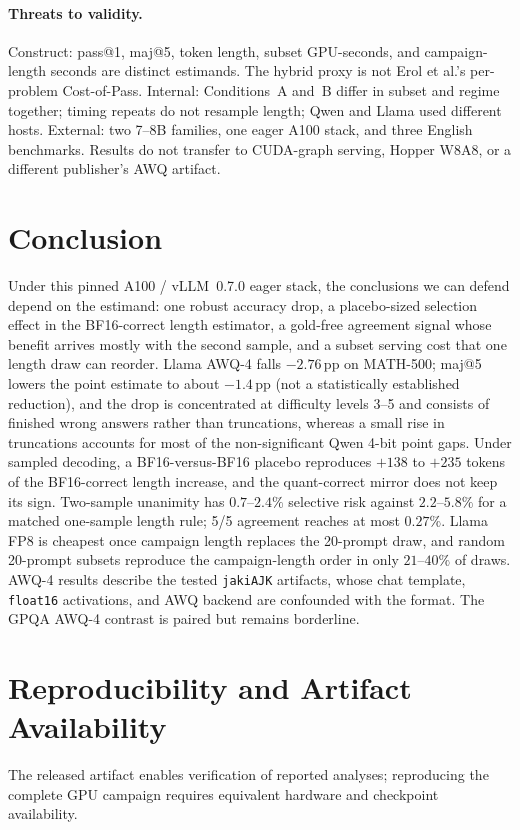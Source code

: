 \documentclass[11pt,a4paper]{article}
\begin{document}
\paragraph{Threats to validity.}
Construct: pass@1, maj@5, token length, subset GPU-seconds, and campaign-length seconds are distinct estimands. The hybrid proxy is not Erol et al.'s per-problem Cost-of-Pass. Internal: Conditions~A and~B differ in subset and regime together; timing repeats do not resample length; Qwen and Llama used different hosts. External: two 7--8B families, one eager A100 stack, and three English benchmarks. Results do not transfer to CUDA-graph serving, Hopper W8A8, or a different publisher's AWQ artifact.

\section{Conclusion}
Under this pinned A100 / vLLM~0.7.0 eager stack, the conclusions we can defend depend on the estimand: one robust accuracy drop, a placebo-sized selection effect in the BF16-correct length estimator, a gold-free agreement signal whose benefit arrives mostly with the second sample, and a subset serving cost that one length draw can reorder. Llama AWQ-4 falls $-2.76$\,pp on MATH-500; maj@5 lowers the point estimate to about $-1.4$\,pp (not a statistically established reduction), and the drop is concentrated at difficulty levels 3--5 and consists of finished wrong answers rather than truncations, whereas a small rise in truncations accounts for most of the non-significant Qwen 4-bit point gaps. Under sampled decoding, a BF16-versus-BF16 placebo reproduces $+138$ to $+235$ tokens of the BF16-correct length increase, and the quant-correct mirror does not keep its sign. Two-sample unanimity has $0.7$--$2.4\%$ selective risk against $2.2$--$5.8\%$ for a matched one-sample length rule; 5/5 agreement reaches at most $0.27\%$. Llama FP8 is cheapest once campaign length replaces the 20-prompt draw, and random 20-prompt subsets reproduce the campaign-length order in only $21$--$40\%$ of draws. AWQ-4 results describe the tested \texttt{jakiAJK} artifacts, whose chat template, \texttt{float16} activations, and AWQ backend are confounded with the format. The GPQA AWQ-4 contrast is paired but remains borderline.

\section*{Reproducibility and Artifact Availability}
The released artifact enables verification of reported analyses; reproducing the complete GPU campaign requires equivalent hardware and checkpoint availability.
\end{document}
